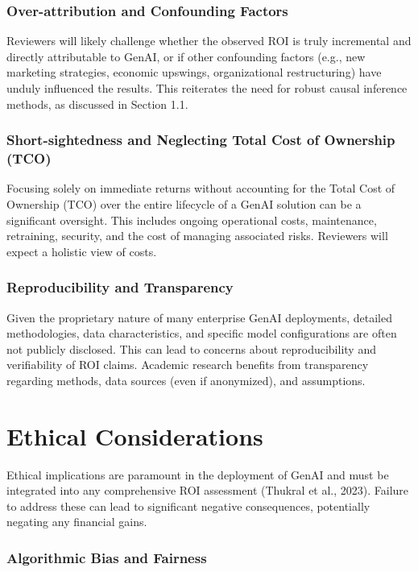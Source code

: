 \documentclass[10pt,twocolumn,letterpaper]{article}
\begin{document}
\subsubsection{Over-attribution and Confounding Factors}

Reviewers will likely challenge whether the observed ROI is truly incremental and directly attributable to GenAI, or if other confounding factors (e.g., new marketing strategies, economic upswings, organizational restructuring) have unduly influenced the results. This reiterates the need for robust causal inference methods, as discussed in Section 1.1.


\subsubsection{Short-sightedness and Neglecting Total Cost of Ownership (TCO)}

Focusing solely on immediate returns without accounting for the Total Cost of Ownership (TCO) over the entire lifecycle of a GenAI solution can be a significant oversight. This includes ongoing operational costs, maintenance, retraining, security, and the cost of managing associated risks. Reviewers will expect a holistic view of costs.


\subsubsection{Reproducibility and Transparency}

Given the proprietary nature of many enterprise GenAI deployments, detailed methodologies, data characteristics, and specific model configurations are often not publicly disclosed. This can lead to concerns about reproducibility and verifiability of ROI claims. Academic research benefits from transparency regarding methods, data sources (even if anonymized), and assumptions.


\section{Ethical Considerations}


Ethical implications are paramount in the deployment of GenAI and must be integrated into any comprehensive ROI assessment (Thukral et al., 2023). Failure to address these can lead to significant negative consequences, potentially negating any financial gains.


\subsubsection{Algorithmic Bias and Fairness}
\end{document}

